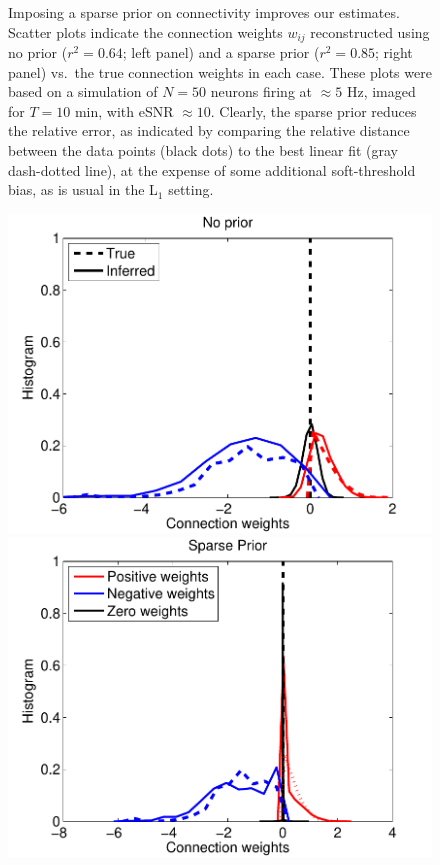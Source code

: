 \documentclass[aoas,preprint]{imsart}
\begin{document}
\begin{figure}[t!]
\caption{Imposing a sparse prior on connectivity improves our
estimates.  Scatter plots indicate the connection weights $w_{ij}$
reconstructed using no prior ($r^2=0.64$; left panel) and a sparse
prior ($r^2=0.85$; right panel) vs.~the true connection weights in
each case.  These plots were based on a simulation of $N=50$ neurons
firing at $\approx 5$ Hz, imaged for $T=10$ min, with eSNR $\approx
10$.  Clearly, the sparse prior reduces the relative error, as
indicated by comparing the relative distance between the data points
(black dots) to the best linear fit (gray dash-dotted line), at the
expense of some additional soft-threshold bias, as is usual in the
L$_1$ setting.}
\label{fig:sparse}
\end{figure}

\begin{figure}[t!]
\centering
\begin{minipage}[c]{0.45\hsize}
\includegraphics[width=\hsize]{../figs/FigureA3_hist_glm200}
\end{minipage}
\begin{minipage}[c]{0.45\hsize}
\includegraphics[width=\hsize]{../figs/FigureA3_hist_spa200}

\end{minipage}
\end{figure}
\end{document}
